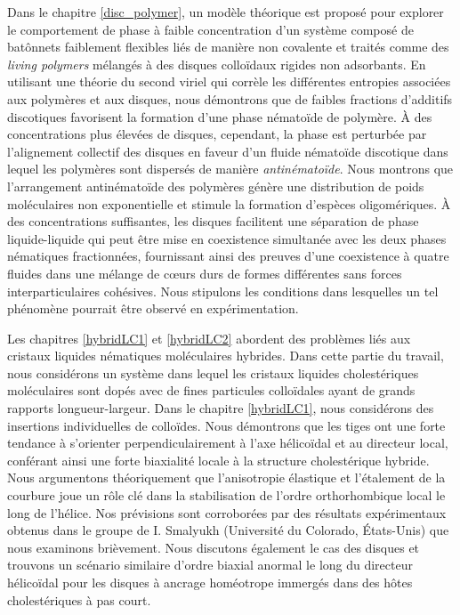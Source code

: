 Dans le chapitre \ref{disc_polymer}, un modèle théorique est proposé pour explorer le comportement de phase à faible concentration d'un système composé de batônnets faiblement flexibles liés de manière non covalente et traités comme des {\em living polymers} mélangés à des disques colloïdaux rigides non adsorbants. En utilisant une théorie du second viriel qui corrèle les différentes entropies associées aux polymères et aux disques, nous démontrons que de faibles fractions d'additifs discotiques favorisent la formation d'une phase nématoïde de polymère. À des concentrations plus élevées de disques, cependant, la phase est perturbée par l'alignement collectif des disques en faveur d'un fluide nématoïde discotique dans lequel les polymères sont dispersés de manière {\em antinématoïde}. Nous montrons que l'arrangement antinématoïde des polymères génère une distribution de poids moléculaires non exponentielle et stimule la formation d'espèces oligomériques. À des concentrations suffisantes, les disques facilitent une séparation de phase liquide-liquide qui peut être mise en coexistence simultanée avec les deux phases nématiques fractionnées, fournissant ainsi des preuves d'une coexistence à quatre fluides dans une mélange de cœurs durs de formes différentes sans forces interparticulaires cohésives. Nous stipulons les conditions dans lesquelles un tel phénomène pourrait être observé en expérimentation.

Les chapitres \ref{hybridLC1} et \ref{hybridLC2} abordent des problèmes liés aux cristaux liquides nématiques moléculaires hybrides. Dans cette partie du travail, nous considérons un système dans lequel les cristaux liquides cholestériques moléculaires sont dopés avec de fines particules colloïdales ayant de grands rapports longueur-largeur. Dans le chapitre \ref{hybridLC1}, nous considérons des insertions individuelles de colloïdes. Nous démontrons que les tiges ont une forte tendance à s'orienter perpendiculairement à l'axe hélicoïdal et au directeur local, conférant ainsi une forte biaxialité locale à la structure cholestérique hybride. Nous argumentons théoriquement que l'anisotropie élastique et l'étalement  de la courbure joue un rôle clé dans la stabilisation de l'ordre orthorhombique local le long de l'hélice. Nos prévisions sont corroborées par des résultats expérimentaux obtenus dans le groupe de I. Smalyukh (Université du Colorado, États-Unis) que nous examinons brièvement. Nous discutons également le cas des disques et trouvons un scénario similaire d'ordre biaxial anormal le long du directeur hélicoïdal pour les disques à ancrage homéotrope immergés dans des hôtes cholestériques à pas court.

